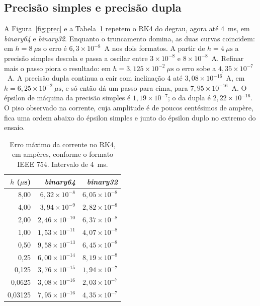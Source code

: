 \subsection{Precisão simples e precisão dupla}
\label{sec:precisao}

A Figura~\ref{fig:prec} e a Tabela~\ref{tab:prec} repetem o RK4 do degrau, agora até 4~ms, em \emph{binary64} e \emph{binary32}. Enquanto o truncamento domina, as duas curvas coincidem: em \(h=8~\mu\mathrm{s}\) o erro é \(6{,}3\times 10^{-8}\)~A nos dois formatos. A partir de \(h=4~\mu\mathrm{s}\) a precisão simples descola e passa a oscilar entre \(3\times 10^{-8}\) e \(8\times 10^{-8}\)~A. Refinar mais o passo piora o resultado: em \(h=3{,}125\times 10^{-2}~\mu\mathrm{s}\) o erro sobe a \(4{,}35\times 10^{-7}\)~A. A precisão dupla continua a cair com inclinação 4 até \(3{,}08\times 10^{-16}\)~A, em \(h=6{,}25\times 10^{-2}~\mu\mathrm{s}\), e só então dá um passo para cima, para \(7{,}95\times 10^{-16}\)~A. O épsilon de máquina da precisão simples é \(1{,}19\times 10^{-7}\); o da dupla é \(2{,}22\times 10^{-16}\). O piso observado na corrente, cuja amplitude é de poucos centésimos de ampère, fica uma ordem abaixo do épsilon simples e junto do épsilon duplo no extremo do ensaio.

\begin{table}[htbp]
\centering
\caption{Erro máximo da corrente no RK4, em ampères, conforme o formato IEEE 754. Intervalo de 4~ms.}
\label{tab:prec}
\small
\begin{tabular}{@{}rrr@{}}
\toprule
\(h\) (\(\mu\)s) & \emph{binary64} & \emph{binary32} \\
\midrule
8{,}00 & \(6{,}32\times 10^{-8}\) & \(6{,}05\times 10^{-8}\) \\
4{,}00 & \(3{,}94\times 10^{-9}\) & \(2{,}82\times 10^{-8}\) \\
2{,}00 & \(2{,}46\times 10^{-10}\) & \(6{,}37\times 10^{-8}\) \\
1{,}00 & \(1{,}53\times 10^{-11}\) & \(4{,}07\times 10^{-8}\) \\
0{,}50 & \(9{,}58\times 10^{-13}\) & \(6{,}45\times 10^{-8}\) \\
0{,}25 & \(6{,}00\times 10^{-14}\) & \(8{,}19\times 10^{-8}\) \\
0{,}125 & \(3{,}76\times 10^{-15}\) & \(1{,}94\times 10^{-7}\) \\
0{,}0625 & \(3{,}08\times 10^{-16}\) & \(2{,}03\times 10^{-7}\) \\
0{,}03125 & \(7{,}95\times 10^{-16}\) & \(4{,}35\times 10^{-7}\) \\
\bottomrule
\end{tabular}
\end{table}

